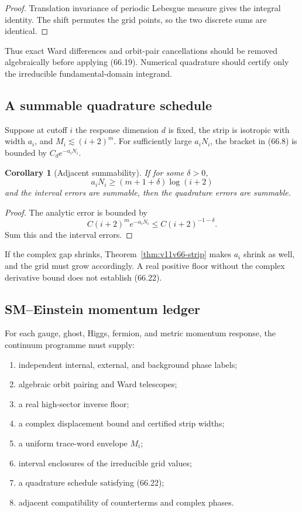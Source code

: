 \documentclass[11pt]{article}
\newtheorem{corollary}[theorem]{Corollary}
\begin{document}
\begin{proof}
Translation invariance of periodic Lebesgue measure gives the integral
identity.  The shift permutes the grid points, so the two discrete sums
are identical.
\end{proof}

Thus exact Ward differences and orbit-pair cancellations should be
removed algebraically before applying (66.19).  Numerical quadrature
should certify only the irreducible fundamental-domain integrand.

\subsection{A summable quadrature schedule}

Suppose at cutoff \(i\) the response dimension \(d\) is fixed, the
strip is isotropic with width \(a_i\), and
\(M_i\lesssim(i+2)^m\).  For sufficiently large \(a_iN_i\), the
bracket in (66.8) is bounded by \(C_de^{-a_iN_i}\).

\begin{corollary}[Adjacent summability]
\label{cor:v11v66-schedule}
If for some \(\delta>0\),
\[
                         a_iN_i\ge(m+1+\delta)\log(i+2)        \tag{66.22}
\]
and the interval errors are summable, then the quadrature errors are
summable.
\end{corollary}

\begin{proof}
The analytic error is bounded by
\[
 C(i+2)^m e^{-a_iN_i}
 \le C(i+2)^{-1-\delta}.
\]
Sum this and the interval errors.
\end{proof}

If the complex gap shrinks, Theorem~\ref{thm:v11v66-strip} makes
\(a_i\) shrink as well, and the grid must grow accordingly.  A real
positive floor without the complex derivative bound does not establish
(66.22).

\subsection{SM--Einstein momentum ledger}

\begin{ledger}
\label{led:v11v66-data}
For each gauge, ghost, Higgs, fermion, and metric momentum response,
the continuum programme must supply:
\begin{enumerate}
\item independent internal, external, and background phase labels;
\item algebraic orbit pairing and Ward telescopes;
\item a real high-sector inverse floor;
\item a complex displacement bound and certified strip widths;
\item a uniform trace-word envelope \(M_i\);
\item interval enclosures of the irreducible grid values;
\item a quadrature schedule satisfying (66.22);
\item adjacent compatibility of counterterms and complex phases.
\end{enumerate}
\end{ledger}
\end{document}
